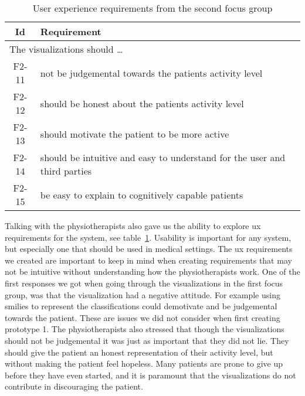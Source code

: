 \begin{table}[h!]
  \begin{center}
  \begin{tabular}{|c|p{12cm}|}
    \hline
      \textbf{Id} & \textbf{Requirement} \\ \hline
    \multicolumn{2}{|l|}{The visualizations should \ldots} \\ \hline
      F2-11 & not be judgemental towards the patients activity level \\ \hline
      F2-12 & should be honest about the patients activity level \\ \hline
      F2-13 & should motivate the patient to be more active \\ \hline
      F2-14 & should be intuitive and easy to understand for the user and third parties \\ \hline
      F2-15 & be easy to explain to cognitively capable patients \\ \hline
      
  \end{tabular}
  \end{center}
  \caption{User experience requirements from the second focus group}
  \label{tab:f2ReqUx}
\end{table}



Talking with the physiotherapists also gave us the ability to explore \gls{ux} requirements for the system, see table~\ref{tab:f2ReqUx}. Usability is important for any system, but especially one that should be used in medical settings. %
The \gls{ux} requirements we created are important to keep in mind when creating requirements that may not be intuitive without understanding how the physiotherapists work. One of the first responses we got when going through the visualizations in the first focus group, was that the visualization had a negative attitude. For example using smilies to represent the classifications could demotivate and be judgemental towards the patient. These are issues we did not consider when first creating prototype 1. The physiotherapists also stressed that though the visualizations should not be judgemental it was just as important that they did not lie. They should give the patient an honest representation of their activity level, but without making the patient feel hopeless. Many patients are prone to give up before they have even started, and it is paramount that the visualizations do not contribute in discouraging the patient.

